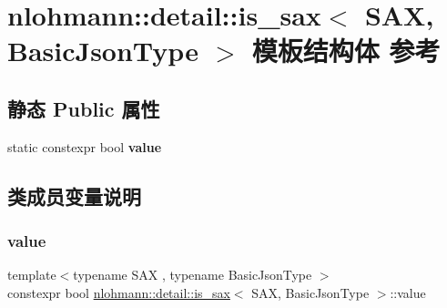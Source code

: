 \hypertarget{structnlohmann_1_1detail_1_1is__sax}{}\section{nlohmann\+::detail\+::is\+\_\+sax$<$ S\+AX, Basic\+Json\+Type $>$ 模板结构体 参考}
\label{structnlohmann_1_1detail_1_1is__sax}
\subsection*{静态 Public 属性}
\begin{DoxyCompactItemize}
\item 
static constexpr bool {\bfseries value}
\end{DoxyCompactItemize}


\subsection{类成员变量说明}
\mbox{\label{structnlohmann_1_1detail_1_1is__sax_a8ab7e51087000e948b4a2492257484dc}} 
\subsubsection{\texorpdfstring{value}{value}}
{\footnotesize\ttfamily template$<$typename S\+AX , typename Basic\+Json\+Type $>$ \\
constexpr bool \mbox{\hyperlink{structnlohmann_1_1detail_1_1is__sax}{nlohmann\+::detail\+::is\+\_\+sax}}$<$ S\+AX, Basic\+Json\+Type $>$\+::value\hspace{0.3cm}{\ttfamily [static]}}

